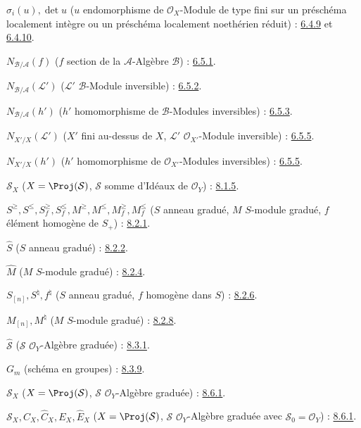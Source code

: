 $\sigma_i(u),\det u$
($u$ endomorphisme de $\mathcal{O}_X$-Module de type fini sur un préschéma
localement intègre ou un préschéma localement noethérien réduit) :
\hyperref[II.6.4.9-fr]{6.4.9} et \hyperref[II.6.4.10-fr]{6.4.10}.

$N_{\mathcal{B}/\mathcal{A}}(f)$
($f$ section de la $\mathcal{A}$-Algèbre $\mathcal{B}$) : \hyperref[II.6.5.1-fr]{6.5.1}.

$N_{\mathcal{B}/\mathcal{A}}(\mathcal{L}')$
($\mathcal{L}'$ $\mathcal{B}$-Module inversible) : \hyperref[II.6.5.2-fr]{6.5.2}.

$N_{\mathcal{B}/\mathcal{A}}(h')$
($h'$ homomorphisme de $\mathcal{B}$-Modules inversibles) : \hyperref[II.6.5.3-fr]{6.5.3}.

$N_{X'/X}(\mathcal{L}')$
($X'$ fini au-dessus de $X$, $\mathcal{L}'$ $\mathcal{O}_{X'}$-Module inversible) : \hyperref[II.6.5.5-fr]{6.5.5}.

$N_{X'/X}(h')$
($h'$ homomorphisme de $\mathcal{O}_{X'}$-Modules inversibles) : \hyperref[II.6.5.5-fr]{6.5.5}.

$\mathcal{S}_X$ ($X=\Proj(\mathcal{S})$, $\mathcal{S}$ somme d'Idéaux de
$\mathcal{O}_Y$) : \hyperref[II.8.1.5-fr]{8.1.5}.

$S^\geq,S^\leq,S_f^\geq,S_f^\leq,
M^\geq,M^\leq,M_f^\geq,M_f^\leq$
($S$ anneau gradué, $M$ $S$-module gradué,
$f$ élément homogène de $S_+$) : \hyperref[II.8.2.1-fr]{8.2.1}.

$\widehat S$ ($S$ anneau gradué) : \hyperref[II.8.2.2-fr]{8.2.2}.

$\widehat M$ ($M$ $S$-module gradué) : \hyperref[II.8.2.4-fr]{8.2.4}.

$S_{[n]},S^\natural,f^\natural$
($S$ anneau gradué, $f$ homogène dans $S$) : \hyperref[II.8.2.6-fr]{8.2.6}.

$M_{[n]},M^\natural$ ($M$ $S$-module gradué) : \hyperref[II.8.2.8-fr]{8.2.8}.

$\widehat{\mathcal{S}}$ ($\mathcal{S}$ $\mathcal{O}_Y$-Algèbre graduée) : \hyperref[II.8.3.1-fr]{8.3.1}.

$G_m$ (schéma en groupes) : \hyperref[II.8.3.9-fr]{8.3.9}.

$\mathcal{S}_X$ ($X=\Proj(\mathcal{S})$, $\mathcal{S}$ $\mathcal{O}_Y$-Algèbre graduée) : \hyperref[II.8.6.1-fr]{8.6.1}.

$\mathcal{S}_X,C_X,\widehat C_X,E_X,\widehat E_X$
($X=\Proj(\mathcal{S})$, $\mathcal{S}$ $\mathcal{O}_Y$-Algèbre graduée
avec $\mathcal{S}_0=\mathcal{O}_Y$) : \hyperref[II.8.6.1-fr]{8.6.1}.

